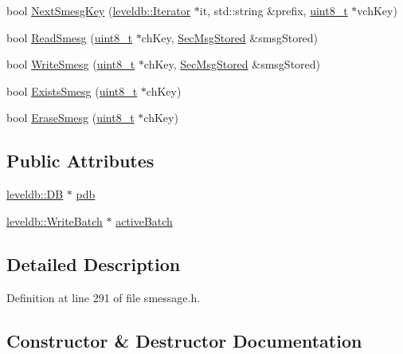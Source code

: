 \begin{DoxyCompactItemize}
\item 
bool \hyperlink{class_sec_msg_d_b_a6aa8320d9850912374a74823024df701}{Next\+Smesg\+Key} (\hyperlink{classleveldb_1_1_iterator}{leveldb\+::\+Iterator} $\ast$it, std\+::string \&prefix, \hyperlink{stdint_8h_aba7bc1797add20fe3efdf37ced1182c5}{uint8\+\_\+t} $\ast$vch\+Key)
\item 
bool \hyperlink{class_sec_msg_d_b_a35c86d596ed6c60f4d62cc3e551356d2}{Read\+Smesg} (\hyperlink{stdint_8h_aba7bc1797add20fe3efdf37ced1182c5}{uint8\+\_\+t} $\ast$ch\+Key, \hyperlink{class_sec_msg_stored}{Sec\+Msg\+Stored} \&smsg\+Stored)
\item 
bool \hyperlink{class_sec_msg_d_b_af254b80ad938946841361c77cb09be0a}{Write\+Smesg} (\hyperlink{stdint_8h_aba7bc1797add20fe3efdf37ced1182c5}{uint8\+\_\+t} $\ast$ch\+Key, \hyperlink{class_sec_msg_stored}{Sec\+Msg\+Stored} \&smsg\+Stored)
\item 
bool \hyperlink{class_sec_msg_d_b_ad9869377019ded94b70a3c4a9ba2afb0}{Exists\+Smesg} (\hyperlink{stdint_8h_aba7bc1797add20fe3efdf37ced1182c5}{uint8\+\_\+t} $\ast$ch\+Key)
\item 
bool \hyperlink{class_sec_msg_d_b_a7d00fef57cf02d33e0b076ca114f7af5}{Erase\+Smesg} (\hyperlink{stdint_8h_aba7bc1797add20fe3efdf37ced1182c5}{uint8\+\_\+t} $\ast$ch\+Key)
\end{DoxyCompactItemize}
\subsection*{Public Attributes}
\begin{DoxyCompactItemize}
\item 
\hyperlink{classleveldb_1_1_d_b}{leveldb\+::\+D\+B} $\ast$ \hyperlink{class_sec_msg_d_b_a3715bf85e5e420c6c3ec5335bec80ed0}{pdb}
\item 
\hyperlink{classleveldb_1_1_write_batch}{leveldb\+::\+Write\+Batch} $\ast$ \hyperlink{class_sec_msg_d_b_add6d2066ed0af0b4fcaef2739663e2c4}{active\+Batch}
\end{DoxyCompactItemize}


\subsection{Detailed Description}


Definition at line 291 of file smessage.\+h.



\subsection{Constructor \& Destructor Documentation}
\hypertarget{class_sec_msg_d_b_a903159afeb64ca142f9f2634929e57fd}{}

